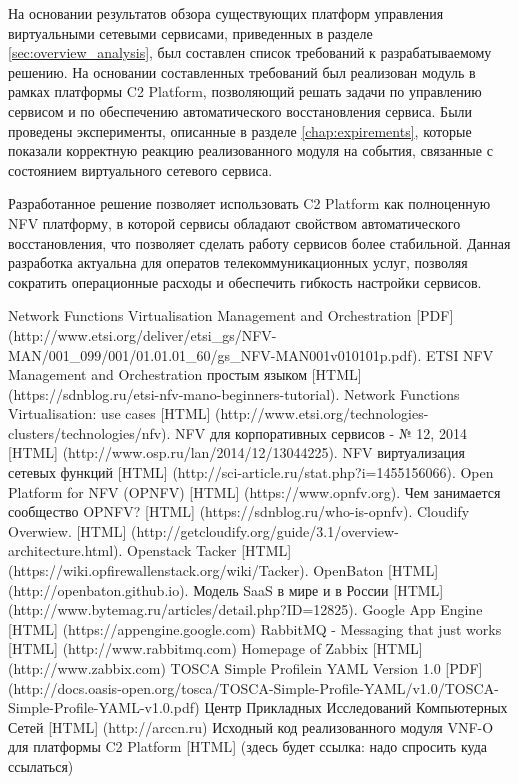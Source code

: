 \documentclass[oneside,final,14pt,a4paper]{extreport}
\begin{document}
На основании результатов обзора существующих платформ управления виртуальными сетевыми сервисами, приведенных в разделе \ref{sec:overview_analysis}, был составлен список требований к разрабатываемому решению. На основании составленных требований был реализован модуль в рамках платформы C2 Platform, позволяющий решать задачи по управлению сервисом и по обеспечению автоматического восстановления сервиса. Были проведены эксперименты, описанные в разделе \ref{chap:expirements}, которые показали корректную реакцию реализованного модуля на события, связанные с состоянием виртуального сетевого сервиса.

Разработанное решение позволяет использовать C2 Platform как полноценную NFV платформу, в которой сервисы обладают свойством автоматического восстановления, что позволяет сделать работу сервисов более стабильной. Данная разработка актуальна для оператов телекоммуникационных услуг, позволяя сократить операционные расходы и обеспечить гибкость настройки сервисов.





\begin{thebibliography}{00}
 Network Functions Virtualisation Management and Orchestration [PDF] (http://www.etsi.org/deliver/etsi\_gs/NFV-MAN/001\_099/001/01.01.01\_60/gs\_NFV-MAN001v010101p.pdf).
 ETSI NFV Management and Orchestration простым языком [HTML] (https://sdnblog.ru/etsi-nfv-mano-beginners-tutorial).
 Network Functions Virtualisation: use cases [HTML] (http://www.etsi.org/technologies-clusters/technologies/nfv).
 NFV для корпоративных сервисов - № 12, 2014 [HTML] (http://www.osp.ru/lan/2014/12/13044225).
 NFV виртуализация сетевых функций [HTML] (http://sci-article.ru/stat.php?i=1455156066).
 Open Platform for NFV (OPNFV) [HTML] (https://www.opnfv.org).
 Чем занимается сообщество OPNFV? [HTML] (https://sdnblog.ru/who-is-opnfv).
 Cloudify Overwiew. [HTML] (http://getcloudify.org/guide/3.1/overview-architecture.html).
 Openstack Tacker [HTML] (https://wiki.opfirewallenstack.org/wiki/Tacker).
 OpenBaton [HTML] (http://openbaton.github.io).
 Модель SaaS в мире и в России [HTML] (http://www.bytemag.ru/articles/detail.php?ID=12825).
 Google App Engine [HTML] (https://appengine.google.com)
 RabbitMQ - Messaging that just works [HTML] (http://www.rabbitmq.com)
 Homepage of Zabbix [HTML] (http://www.zabbix.com)
 TOSCA Simple Profilein YAML Version 1.0 [PDF] (http://docs.oasis-open.org/tosca/TOSCA-Simple-Profile-YAML/v1.0/TOSCA-Simple-Profile-YAML-v1.0.pdf)
 Центр Прикладных Исследований Компьютерных Сетей [HTML] (http://arccn.ru)
 Исходный код реализованного модуля VNF-O для платформы C2 Platform [HTML] (здесь будет ссылка: надо спросить куда ссылаться)
\end{thebibliography}

\end{document}
